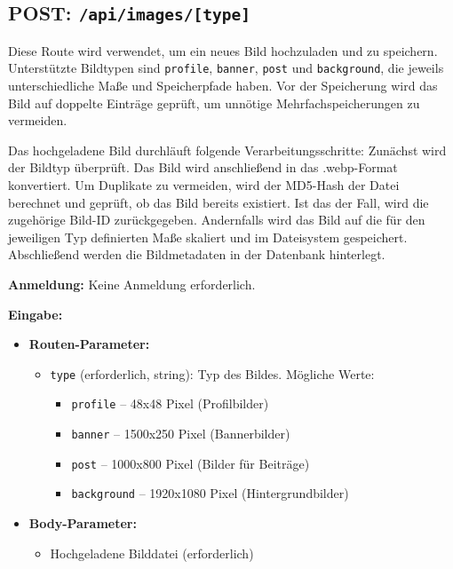 \documentclass[a4paper,12pt]{article}
\begin{document}
\newpage
\subsection{POST: \texttt{/api/images/[type]}}

Diese Route wird verwendet, um ein neues Bild hochzuladen und zu speichern.
Unterstützte Bildtypen sind \texttt{profile}, \texttt{banner}, \texttt{post}
und \texttt{background}, die jeweils unterschiedliche Maße und Speicherpfade
haben. Vor der Speicherung wird das Bild auf doppelte Einträge geprüft, um
unnötige Mehrfachspeicherungen zu vermeiden.

Das hochgeladene Bild durchläuft folgende Verarbeitungsschritte: Zunächst wird
der Bildtyp überprüft. Das Bild wird anschließend in das .webp-Format
konvertiert. Um Duplikate zu vermeiden, wird der MD5-Hash der Datei berechnet
und geprüft, ob das Bild bereits existiert. Ist das der Fall, wird die
zugehörige Bild-ID zurückgegeben. Andernfalls wird das Bild auf die für den
jeweiligen Typ definierten Maße skaliert und im Dateisystem gespeichert.
Abschließend werden die Bildmetadaten in der Datenbank hinterlegt.

\textbf{Anmeldung:} Keine Anmeldung erforderlich.

\textbf{Eingabe:}
\begin{itemize}
    \item \textbf{Routen-Parameter:}
    \begin{itemize}
        \item \texttt{type} (erforderlich, string): Typ des Bildes. Mögliche Werte:
        \begin{itemize}
            \item \texttt{profile} – 48x48 Pixel (Profilbilder)
            \item \texttt{banner} – 1500x250 Pixel (Bannerbilder)
            \item \texttt{post} – 1000x800 Pixel (Bilder für Beiträge)
            \item \texttt{background} – 1920x1080 Pixel (Hintergrundbilder)
        \end{itemize}
    \end{itemize}
    \item \textbf{Body-Parameter:}
    \begin{itemize}
        \item Hochgeladene Bilddatei (erforderlich)
    \end{itemize}
\end{itemize}
\end{document}
